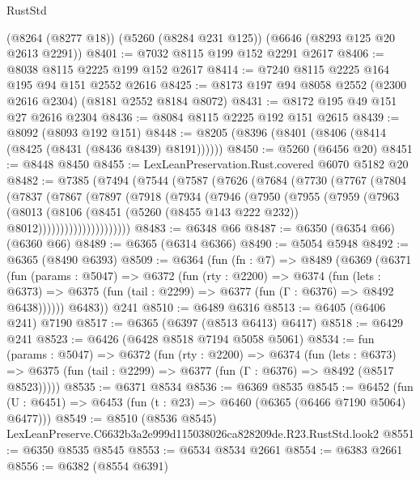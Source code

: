 \begin{lexlean}{RustStd}
\begin{coremodule}
    (@8264 (@8277 @18))
    (@5260 (@8284 @231 @125))
    (@6646 (@8293 @125 @20 @2613 @2291))
@8401 := @7032 @8115 @199 @152 @2291 @2617
@8406 := @8038 @8115 @2225 @199 @152 @2617
@8414 := @7240 @8115 @2225 @164 @195 @94 @151 @2552 @2616
@8425 := @8173 @197 @94 @8058 @2552 (@2300 @2616 @2304) (@8181 @2552 @8184 @8072)
@8431 := @8172 @195 @49 @151 @27 @2616 @2304
@8436 := @8084 @8115 @2225 @192 @151 @2615
@8439 := @8092 (@8093 @192 @151)
@8448 := @8205 (@8396 (@8401 (@8406 (@8414 (@8425 (@8431 (@8436 @8439) @8191))))))
@8450 := @5260 (@6456 @20)
@8451 := @8448 @8450
@8455 := LexLeanPreservation.Rust.covered @6070 @5182 @20
@8482 := @7385
    (@7494
      (@7544
        (@7587
          (@7626
            (@7684
              (@7730
                (@7767
                  (@7804
                    (@7837
                      (@7867
                        (@7897
                          (@7918
                            (@7934
                              (@7946
                                (@7950
                                  (@7955
                                    (@7959
                                      (@7963
                                        (@8013
                                          (@8106
                                            (@8451
                                              (@5260 (@8455 @143 @222 @232))
                                              @8012)))))))))))))))))))))
@8483 := @6348 @66
@8487 := @6350 (@6354 @66) (@6360 @66)
@8489 := @6365 (@6314 @6366)
@8490 := @5054 @5948
@8492 := @6365 (@8490 @6393)
@8509 := @6364
    (fun (fn : @7) =>
    @8489
      (@6369
        (@6371
          (fun (params : @5047) =>
          @6372
            (fun (rty : @2200) =>
            @6374
              (fun (lets : @6373) =>
              @6375 (fun (tail : @2299) => @6377 (fun (Γ : @6376) => @8492 @6438))))))
        @6483))
    @241
@8510 := @6489 @6316
@8513 := @6405 (@6406 @241) @7190
@8517 := @6365 (@6397 (@8513 @6413) @6417)
@8518 := @6429 @241
@8523 := @6426 (@6428 @8518 @7194 @5058 @5061)
@8534 := fun (params : @5047) =>
  @6372
    (fun (rty : @2200) =>
    @6374
      (fun (lets : @6373) =>
      @6375 (fun (tail : @2299) => @6377 (fun (Γ : @6376) => @8492 (@8517 @8523)))))
@8535 := @6371 @8534
@8536 := @6369 @8535
@8545 := @6452 (fun (U : @6451) => @6453 (fun (t : @23) => @6460 (@6365 (@6466 @7190 @5064) @6477)))
@8549 := @8510 (@8536 @8545) LexLeanPreserve.C6632b3a2e999d115038026ca828209de.R23.RustStd.look2
@8551 := @6350 @8535 @8545
@8553 := @6534 @8534 @2661
@8554 := @6383 @2661
@8556 := @6382 (@8554 @6391)

\end{coremodule}
\end{lexlean}
